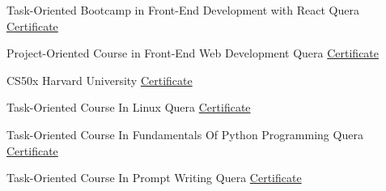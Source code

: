 
\begin{cvhonors}
  \cvhonor
    {Task-Oriented Bootcamp in Front-End Development with React}
    {Quera}
    {\href{https://quera.org/certificate/1TyQm8RV/}{Certificate}}
    {} %

  \cvhonor
    {Project-Oriented Course in Front-End Web Development}
    {Quera}
    {\href{https://quera.org/certificate/Z4shbXOc/}{Certificate}}
    {}

  \cvhonor
    {CS50x}
    {Harvard University}
    {\href{https://certificates.cs50.io/732f87e9-6550-444e-8ad6-99922c3aca9c.pdf}{Certificate}}
    {}
    
  \cvhonor
    {Task-Oriented Course In Linux}
    {Quera}
    {\href{https://quera.org/certificate/oBvP6gms/}{Certificate}}
    {}

  \cvhonor
    {Task-Oriented Course In Fundamentals Of Python Programming}
    {Quera}
    {\href{https://quera.org/certificate/33b4vSHp/}{Certificate}}
    {}

  \cvhonor
    {Task-Oriented Course In Prompt Writing}
    {Quera}
    {\href{https://quera.org/certificate/3CfoovY6/}{Certificate}}
    {}

\end{cvhonors}
